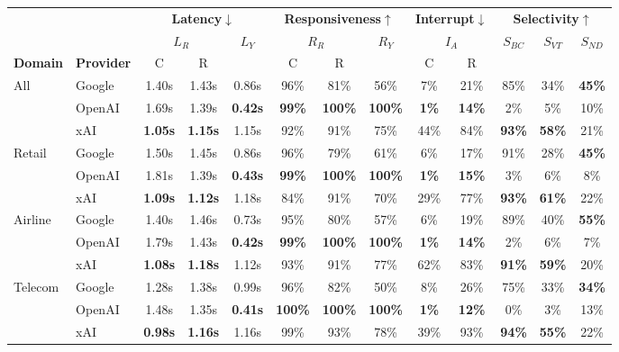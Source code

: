 \begin{tabular}{@{}ll|cc|c|cc|c|cc|ccc@{}}
\toprule
 & & \multicolumn{3}{c|}{\textbf{Latency}$\downarrow$} & \multicolumn{3}{c|}{\textbf{Responsiveness}$\uparrow$} & \multicolumn{2}{c|}{\textbf{Interrupt}$\downarrow$} & \multicolumn{3}{c}{\textbf{Selectivity}$\uparrow$} \\
 & & \multicolumn{2}{c|}{$L_R$} & \multirow{2}{*}{$L_Y$} & \multicolumn{2}{c|}{$R_R$} & \multirow{2}{*}{$R_Y$} & \multicolumn{2}{c|}{$I_A$} & \multirow{2}{*}{$S_{BC}$} & \multirow{2}{*}{$S_{VT}$} & \multirow{2}{*}{$S_{ND}$} \\
\textbf{Domain} & \textbf{Provider} & C & R & & C & R & & C & R & & & \\
\midrule
\multirow{3}{*}{All} & Google & 1.40s & 1.43s & 0.86s & 96\% & 81\% & 56\% & 7\% & 21\% & 85\% & 34\% & \textbf{45\%} \\
 & OpenAI & 1.69s & 1.39s & \textbf{0.42s} & \textbf{99\%} & \textbf{100\%} & \textbf{100\%} & \textbf{1\%} & \textbf{14\%} & 2\% & 5\% & 10\% \\
 & xAI & \textbf{1.05s} & \textbf{1.15s} & 1.15s & 92\% & 91\% & 75\% & 44\% & 84\% & \textbf{93\%} & \textbf{58\%} & 21\% \\
\midrule
\multirow{3}{*}{Retail} & Google & 1.50s & 1.45s & 0.86s & 96\% & 79\% & 61\% & 6\% & 17\% & 91\% & 28\% & \textbf{45\%} \\
 & OpenAI & 1.81s & 1.39s & \textbf{0.43s} & \textbf{99\%} & \textbf{100\%} & \textbf{100\%} & \textbf{1\%} & \textbf{15\%} & 3\% & 6\% & 8\% \\
 & xAI & \textbf{1.09s} & \textbf{1.12s} & 1.18s & 84\% & 91\% & 70\% & 29\% & 77\% & \textbf{93\%} & \textbf{61\%} & 22\% \\
\midrule
\multirow{3}{*}{Airline} & Google & 1.40s & 1.46s & 0.73s & 95\% & 80\% & 57\% & 6\% & 19\% & 89\% & 40\% & \textbf{55\%} \\
 & OpenAI & 1.79s & 1.43s & \textbf{0.42s} & \textbf{99\%} & \textbf{100\%} & \textbf{100\%} & \textbf{1\%} & \textbf{14\%} & 2\% & 6\% & 7\% \\
 & xAI & \textbf{1.08s} & \textbf{1.18s} & 1.12s & 93\% & 91\% & 77\% & 62\% & 83\% & \textbf{91\%} & \textbf{59\%} & 20\% \\
\midrule
\multirow{3}{*}{Telecom} & Google & 1.28s & 1.38s & 0.99s & 96\% & 82\% & 50\% & 8\% & 26\% & 75\% & 33\% & \textbf{34\%} \\
 & OpenAI & 1.48s & 1.35s & \textbf{0.41s} & \textbf{100\%} & \textbf{100\%} & \textbf{100\%} & \textbf{1\%} & \textbf{12\%} & 0\% & 3\% & 13\% \\
 & xAI & \textbf{0.98s} & \textbf{1.16s} & 1.16s & 99\% & 93\% & 78\% & 39\% & 93\% & \textbf{94\%} & \textbf{55\%} & 22\% \\
\bottomrule
\end{tabular}
